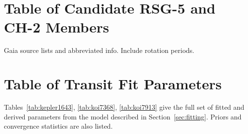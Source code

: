 \documentclass[12pt,twocolumn,linenumbers]{aastex63}
\begin{document}

% 
% 
% 
% 

\clearpage
                            
 

\appendix
\section{Table of Candidate RSG-5 and CH-2 Members}
\label{app:members}

Gaia source lists and abbreviated info.  Include rotation periods.

\section{Table of Transit Fit Parameters}
\label{app:transit}

Tables~\ref{tab:kepler1643}, \ref{tab:koi7368}, \ref{tab:koi7913} give
the full set of fitted and derived parameters from the model described in
Section~\ref{sec:fitting}.
Priors and convergence statistics are also listed.






\end{document}

